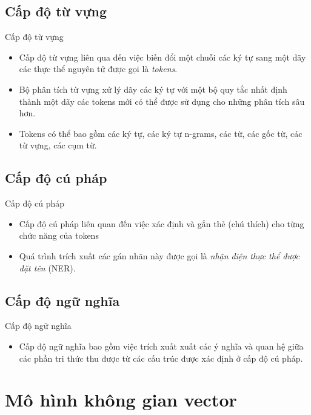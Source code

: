 \documentclass[10pt]{beamer}
\theoremstyle{remark}
\theoremstyle{definition}
\begin{document}
\subsection{Cấp độ từ vựng}

\begin{frame}{Cấp độ từ vựng}
	\begin{itemize}
		\item Cấp độ từ vựng liên qua đến việc biến đổi một chuỗi các ký tự sang một dãy các thực thể nguyên tử được gọi là \textit{tokens}.
		\item Bộ phân tích từ vựng xử lý dãy các ký tự với một bộ quy tắc nhất định thành một dãy các tokens mới có thể được sử dụng cho những phân tích sâu hơn.
		\item Tokens có thể bao gồm các ký tự, các ký tự n-grams, các từ, các gốc từ, các từ vựng, các cụm từ.
	\end{itemize}
    
\end{frame}

\subsection{Cấp độ cú pháp}

\begin{frame}{Cấp độ cú pháp}
	\begin{itemize}
		\item Cấp độ cú pháp liên quan đến việc xác định và gắn thẻ (chú thích) cho từng chức năng của tokens
		\item Quá trình trích xuất các gán nhãn này được gọi là \textit{nhận diện thực thể được đặt tên} (NER).
	\end{itemize}
\end{frame}

\subsection{Cấp độ ngữ nghĩa}

\begin{frame}{Cấp độ ngữ nghĩa}
	\begin{itemize}
		\item Cấp độ ngữ nghĩa bao gồm việc trích xuất xuất các ý nghĩa và quan hệ giữa các phần tri thức thu được từ các cấu trúc được xác định ở cấp độ cú pháp.
	\end{itemize}
\end{frame}

\section{Mô hình không gian vector}
\end{document}
